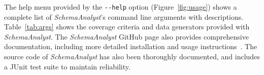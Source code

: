 The help menu provided by the \lstinline{--help} option (Figure~\ref{fig:usage}) shows a complete list of \textit{SchemaAnalyst}'s
command line arguments with descriptions. Table~\ref{tab:args} shows the coverage criteria and data generators
provided with \textit{SchemaAnalyst}. The \textit{SchemaAnalyst} GitHub page also provides comprehensive
documentation, including more detailed installation and usage instructions~\cite{tool}. The source code of
\textit{SchemaAnalyst} has also been thoroughly documented, and
includes a JUnit test suite to maintain reliability.

